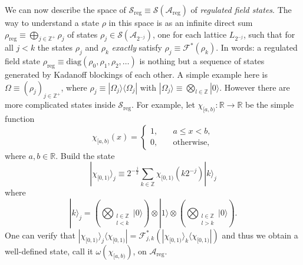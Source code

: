 \documentclass[11pt]{amsart}
\theoremstyle{plain}%
\theoremstyle{definition}
\theoremstyle{remark}
\begin{document}
We can now describe the space of $\mathcal{S}_{\text{reg}} \equiv \mathcal{S}(\mathcal{A}_{\text{reg}})$ of \emph{regulated field states}. The way to understand a state $\rho$ in this space is as an infinite direct sum $\rho_{\text{reg}} \equiv \bigoplus_{j\in \mathbb{Z}^{+}} \rho_{j}$ of states $\rho_{j} \in \mathcal{S}(\mathcal{A}_{2^{-j}})$, one for each lattice $L_{2^{-j}}$, such that for all $j<k$ the states $\rho_j$ and $\rho_k$ \emph{exactly} satisfy $\rho_j \equiv \mathcal{F}^{*}(\rho_k)$. In words: a regulated field state $\rho_{\text{reg}} \equiv \text{diag}(\rho_0, \rho_1, \rho_2, \ldots)$ is nothing but a sequence of states generated by Kadanoff blockings of each other. A simple example here is $\Omega \equiv (\rho_j)_{j\in \mathbb{Z}^+}$, where $\rho_j \equiv |\Omega_j\rangle\langle \Omega_j|$ with $|\Omega_j\rangle \equiv \bigotimes_{l\in \mathbb{Z}} |0\rangle$. However there are more complicated states inside $\mathcal{S}_{\text{reg}}$. For example, let $\chi_{[a,b)}:\mathbb{R}\rightarrow\mathbb{R}$ be the simple function
\begin{equation}
	\chi_{[a,b)}(x) = \begin{cases} 1,& \quad a\le x < b, \\ 0,& \quad \text{otherwise,}\end{cases}
\end{equation}
where $a,b\in\mathbb{R}$. Build the state
\begin{equation}
	|\chi_{[0,1)}\rangle_j \equiv 2^{-\frac{j}{2}}\sum_{k\in \mathbb{Z}} \chi_{[0,1)}(k2^{-j}) |k\rangle_j
\end{equation}
where 
\begin{equation}
	|k\rangle_j = \left(\bigotimes_{\substack{l\in\mathbb{Z} \\ l < k}} |0\rangle \right)\otimes |1\rangle \otimes\left(\bigotimes_{\substack{l\in\mathbb{Z} \\ l > k}} |0\rangle \right).
\end{equation}
One can verify that $|\chi_{[0,1)}\rangle_j\langle \chi_{[0,1)}| = \mathcal{F}_{j,k}^{*}(|\chi_{[0,1)}\rangle_k\langle \chi_{[0,1)}|)$ and thus we obtain a well-defined state, call it $\omega(\chi_{[a,b)})$, on $\mathcal{A}_{\text{reg}}$.
\end{document}
